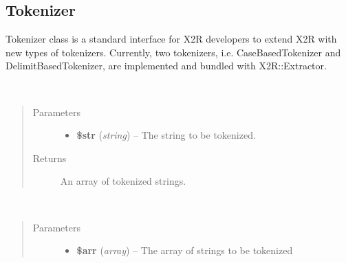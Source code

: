 \documentclass[letterpaper,10pt,english]{sphinxmanual}
\begin{document}
\subsection{Tokenizer}
\label{docs/api:tokenizer}

\begin{fulllineitems}
\label{docs/api:Tokenizer}
Tokenizer class is a standard interface for X2R developers to extend X2R with new types of tokenizers. Currently, two tokenizers, i.e. CaseBasedTokenizer and DelimitBasedTokenizer, are implemented and bundled with X2R::Extractor.

\begin{fulllineitems}
\label{docs/api:Tokenizer::tokenizeString}~\begin{quote}\begin{description}
\item[{Parameters}] \leavevmode\begin{itemize}
\item {} 
\textbf{\$str} (\emph{string}) -- The string to be tokenized.

\end{itemize}

\item[{Returns}] \leavevmode
An array of tokenized strings.

\end{description}\end{quote}

\end{fulllineitems}


\begin{fulllineitems}
\label{docs/api:Tokenizer::tokenizeArrayOfStrings}~\begin{quote}\begin{description}
\item[{Parameters}] \leavevmode\begin{itemize}
\item {} 
\textbf{\$arr} (\emph{array}) -- The array of strings to be tokenized

\end{itemize}


\end{description}
\end{quote}
\end{fulllineitems}
\end{fulllineitems}
\end{document}
